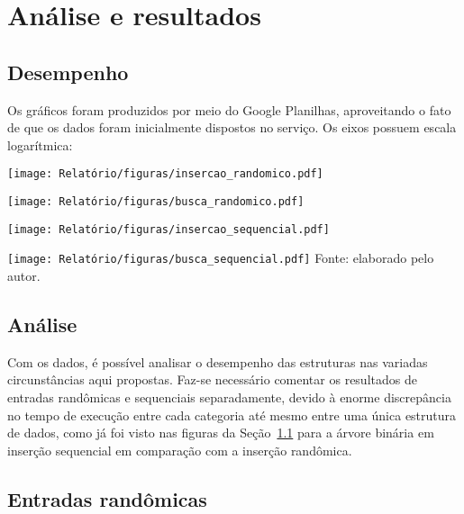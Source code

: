\chapter{Análise e resultados}\label{cap-analise-resultado}

\section{Desempenho}\label{sec-desempenho}
Os gráficos foram produzidos por meio do Google Planilhas, aproveitando o fato de que os dados foram inicialmente dispostos no serviço. Os eixos possuem escala logarítmica:

\begin{center}\label{graf_ins_rand}
    \texttt{[image: Relatório/figuras/insercao\_randomico.pdf]}
\end{center}

\begin{center}\label{graf_busca_rand}
    \texttt{[image: Relatório/figuras/busca\_randomico.pdf]}
\end{center}


\begin{center}\label{graf_ins_seq}
    \texttt{[image: Relatório/figuras/insercao\_sequencial.pdf]}
\end{center}

\begin{center}\label{graf_busca_seq}
    \texttt{[image: Relatório/figuras/busca\_sequencial.pdf]}
    \small{Fonte: elaborado pelo autor.}
\end{center}

\section{Análise}
Com os dados, é possível analisar o desempenho das estruturas nas variadas circunstâncias aqui propostas.
Faz-se necessário comentar os resultados de entradas randômicas e sequenciais separadamente, devido à enorme discrepância no tempo de execução entre cada categoria até mesmo entre uma única estrutura de dados, como já foi visto nas figuras da Seção~\ref{sec-desempenho} para a árvore binária em inserção sequencial em comparação com a inserção randômica.

\section{Entradas randômicas}

